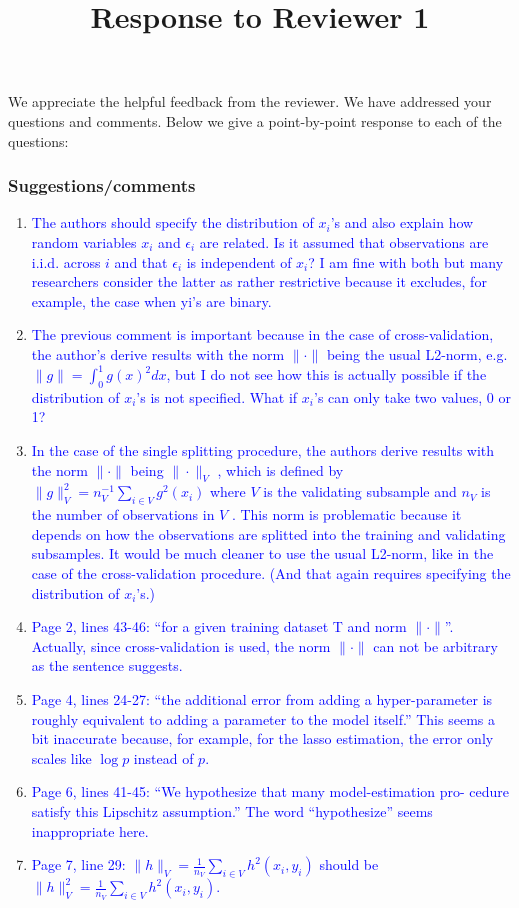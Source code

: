 \documentclass[]{article}
\title{Response to Reviewer 1}
\newcommand{\point}[1]{\item \textcolor{blue}{#1}}
\begin{document}
	
	\maketitle
	
	We appreciate the helpful feedback from the reviewer. We have addressed your questions and comments. Below we give a point-by-point response to each of the questions:
	
	\subsubsection*{Suggestions/comments}
	
	\begin{enumerate}
		\point{
			The authors should specify the distribution of $x_i$'s and also explain how random variables $x_i$ and $\epsilon_i$ are related. Is it assumed that observations are i.i.d. across $i$ and that $\epsilon_i$ is independent of $x_i$? I am fine with both but many researchers consider the latter as rather restrictive because it excludes, for example, the case when yi’s are binary.
		}
		
		\point {
			The previous comment is important because in the case of cross-validation, the author's derive results with the norm $\| \cdot \|$ being the usual L2-norm, e.g. $\|g\| = \int_0^1 g(x)^2 dx $, but I do not see how this is actually possible if the distribution of $x_i$’s is not specified. What if $x_i$’s can only take two values, 0 or 1?
		}
	
		\point{
			In the case of the single splitting procedure, the authors derive results with the norm $\|\cdot\|$ being $\|\cdot\|_V$ , which is defined by $\|g \|_V^2 = n_V^{-1} \sum_{i\in V} g^2(x_i)$ where $V$ is the validating subsample and $n_V$ is the number of observations in $V$ . This norm is problematic because it depends on how the observations are splitted into the training and validating subsamples. It would be much cleaner to use the usual L2-norm, like in the case of the cross-validation procedure. (And that again requires specifying the distribution of $x_i$’s.)
		}
	
		\point{
			Page 2, lines 43-46: “for a given training dataset T and norm $\|\cdot \|$”. Actually, since cross-validation is used, the norm $\|\cdot \|$ can not be arbitrary as the sentence suggests.
		}
	
		\point{
			Page 4, lines 24-27: “the additional error from adding a hyper-parameter is roughly equivalent to adding a parameter to the model itself.” This seems a bit inaccurate because, for example, for the lasso estimation, the error only scales like $\log p$ instead of $p$.
		}
	
		\point{
		Page 6, lines 41-45: “We hypothesize that many model-estimation pro- cedure satisfy this Lipschitz assumption.” The word “hypothesize” seems inappropriate here.
		}
	
		\point{
			Page 7, line 29: $\|h\|_V = \frac{1}{n_V} \sum_{i \in V} h^2(x_i, y_i)$ should be $\|h\|_V^2 = \frac{1}{n_V} \sum_{i \in V} h^2(x_i, y_i).$
		}
	
		\end{enumerate} 
	
\end{document}
